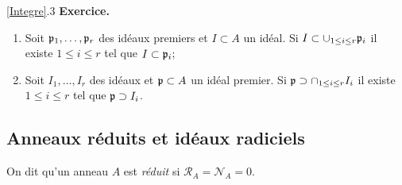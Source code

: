 \documentclass[a4paper, oneside, 12pt]{book}
\theoremstyle{definition} %
\begin{document}
\ref{Integre}.3 \textbf{Exercice.}\begin{enumerate}[leftmargin=* ,parsep=0cm,itemsep=0cm,topsep=0cm]
\item Soit $\frak{p}_1,\dots,\frak{p}_r$ des idéaux premiers et $I\subset A$ un idéal. Si $I\subset \cup_{1\leq i\leq r}\frak{p}_i$ il existe $1\leq i\leq r$ tel que $I\subset \frak{p}_i$;
\item Soit $I_1,\dots, I_r$ des idéaux   et $\frak{p}\subset A$ un idéal premier. Si $\frak{p}\supset \cap_{1\leq i\leq r}I_i$ il existe $1\leq i\leq r$ tel que $\frak{p}\supset I_i$.\\
\end{enumerate}

 



  \subsection{Anneaux réduits et idéaux radiciels}\label{Reduit} On dit qu'un anneau $A$ est \textit{réduit} si  $\mathcal{R}_A=\mathcal{N}_A=0$. \\
  
\end{document}
